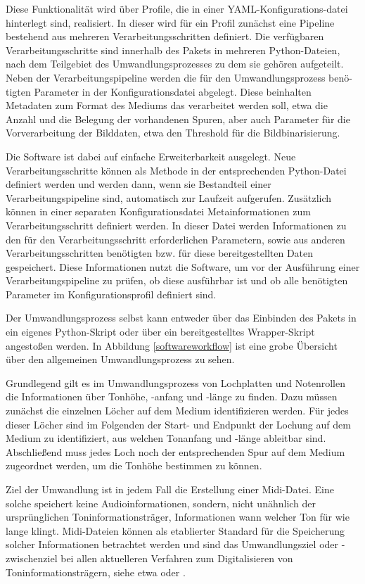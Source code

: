 Diese Funktionalität wird über Profile, die in einer YAML-Konfigurations-datei hinterlegt sind, realisiert.
In dieser wird für ein Profil zunächst eine Pipeline bestehend aus mehreren Verarbeitungsschritten definiert.
Die verfügbaren Verarbeitungsschritte sind innerhalb des Pakets in mehreren Python-Dateien, nach dem Teilgebiet des Umwandlungsprozesses zu dem sie gehören aufgeteilt.
Neben der Verarbeitungspipeline werden die für den Umwandlungsprozess benö-tigten Parameter in der Konfigurationsdatei abgelegt.
Diese beinhalten Metadaten zum Format des Mediums das verarbeitet werden soll, etwa die Anzahl und die Belegung der vorhandenen Spuren, aber auch Parameter für die Vorverarbeitung der Bilddaten, etwa den Threshold für die Bildbinarisierung.

Die Software ist dabei auf einfache Erweiterbarkeit ausgelegt.
Neue Verarbeitungsschritte können als Methode in der entsprechenden Python-Datei definiert werden und werden dann, wenn sie Bestandteil einer Verarbeitungspipeline sind, automatisch zur Laufzeit aufgerufen.
Zusätzlich können in einer separaten Konfigurationsdatei Metainformationen zum Verarbeitungsschritt definiert werden.
In dieser Datei werden Informationen zu den für den Verarbeitungsschritt erforderlichen Parametern, sowie aus anderen Verarbeitungsschritten benötigten bzw. für diese bereitgestellten Daten gespeichert.
Diese Informationen nutzt die Software, um vor der Ausführung einer Verarbeitungspipeline zu prüfen, ob diese ausführbar ist und ob alle benötigten Parameter im Konfigurationsprofil definiert sind.

Der Umwandlungsprozess selbst kann entweder über das Einbinden des Pakets in ein eigenes Python-Skript oder über ein bereitgestelltes Wrapper-Skript angestoßen werden.
In Abbildung \ref*{softwareworkflow} ist eine grobe Übersicht über den allgemeinen Umwandlungsprozess zu sehen.

Grundlegend gilt es im Umwandlungsprozess von Lochplatten und Notenrollen die Informationen über Tonhöhe, -anfang und -länge zu finden.
Dazu müssen zunächst die einzelnen Löcher auf dem Medium identifizieren werden.
Für jedes dieser Löcher sind im Folgenden der Start- und Endpunkt der Lochung auf dem Medium zu identifiziert, aus welchen Tonanfang und -länge ableitbar sind.
Abschließend muss jedes Loch noch der entsprechenden Spur auf dem Medium zugeordnet werden, um die Tonhöhe bestimmen zu können.

Ziel der Umwandlung ist in jedem Fall die Erstellung einer Midi-Datei.
Eine solche speichert keine Audioinformationen, sondern, nicht unähnlich der ursprünglichen Toninformationsträger, Informationen wann welcher Ton für wie lange klingt.
Midi-Dateien können als etablierter Standard für die Speicherung solcher Informationen betrachtet werden und sind das Umwandlungsziel oder -zwischenziel bei allen aktuelleren Verfahren zum Digitalisieren von Toninformationsträgern, siehe etwa \textcite[65]{colmenares_2011} oder \textcite[518]{shi_2019}.

